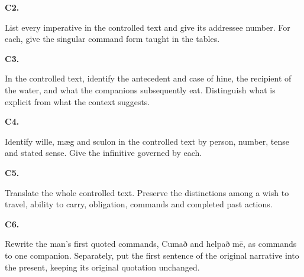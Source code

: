 \par\begin{minipage}{\linewidth}\raggedright
\textbf{C2.}

List every imperative in the controlled text and give its addressee number. For each, give the singular command form taught in the tables.

\end{minipage}\par\addvspace{4pt}

\par\begin{minipage}{\linewidth}\raggedright
\textbf{C3.}

In the controlled text, identify the antecedent and case of hine, the recipient of the water, and what the companions subsequently eat. Distinguish what is explicit from what the context suggests.

\end{minipage}\par\addvspace{4pt}

\par\begin{minipage}{\linewidth}\raggedright
\textbf{C4.}

Identify wille, mæg and sculon in the controlled text by person, number, tense and stated sense. Give the infinitive governed by each.

\end{minipage}\par\addvspace{4pt}

\par\begin{minipage}{\linewidth}\raggedright
\textbf{C5.}

Translate the whole controlled text. Preserve the distinctions among a wish to travel, ability to carry, obligation, commands and completed past actions.

\end{minipage}\par\addvspace{4pt}

\par\begin{minipage}{\linewidth}\raggedright
\textbf{C6.}

Rewrite the man’s first quoted commands, Cumað and helpað mē, as commands to one companion. Separately, put the first sentence of the original narrative into the present, keeping its original quotation unchanged.

\end{minipage}\par\addvspace{4pt}

